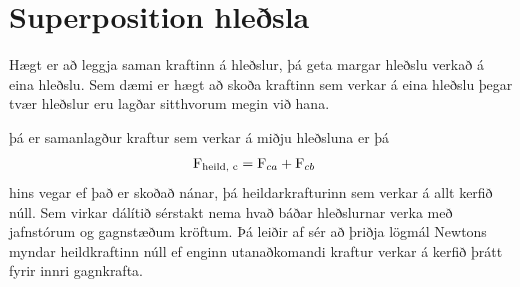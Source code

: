 \section{Superposition hleðsla}
Hægt er að leggja saman kraftinn á hleðslur, þá geta margar hleðslu verkað á
eina hleðslu. Sem dæmi er hægt að skoða kraftinn sem verkar á eina hleðslu
þegar tvær hleðslur eru lagðar sitthvorum megin við hana.
\begin{center}
\end{center}
þá er samanlagður kraftur sem verkar á miðju hleðsluna er þá
\begin{align*}
	\textrm{F}_\text{heild, c} &= \textrm{F}_{ca} + \textrm{F}_{cb}
\end{align*}
hins vegar ef það er skoðað nánar, þá heildarkrafturinn sem verkar á
allt kerfið núll. Sem virkar dálítið sérstakt nema hvað báðar hleðslurnar
verka með jafnstórum og gagnstæðum kröftum. Þá leiðir af sér að
þriðja lögmál Newtons myndar heildkraftinn núll ef enginn
utanaðkomandi kraftur verkar á kerfið þrátt fyrir innri gagnkrafta.
